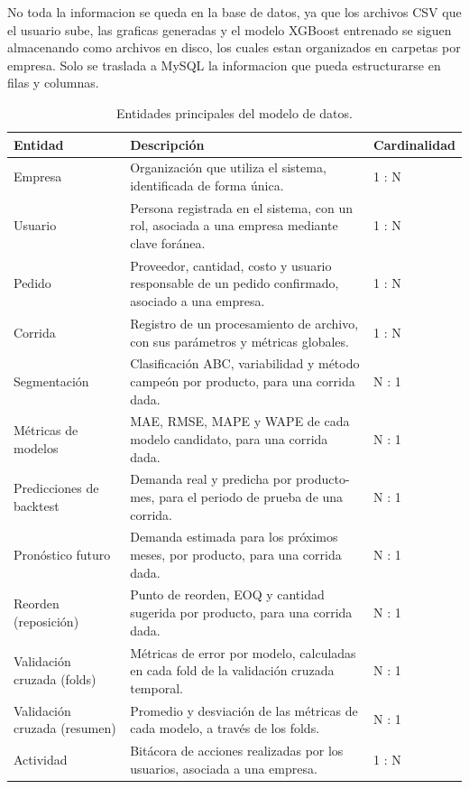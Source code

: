 No toda la informacion se queda en la base de datos, ya que los archivos CSV que el usuario sube, las graficas generadas y el modelo XGBoost entrenado se siguen almacenando como archivos en disco, los cuales estan organizados en carpetas por empresa. Solo se traslada a MySQL la informacion que pueda estructurarse en filas y columnas. 
%
\begin{table}[H]
    \centering
    \caption{Entidades principales del modelo de datos.}
    \label{tab:entidades}
    \begin{tabularx}{\textwidth}{lXl}
        \toprule
        \textbf{Entidad} & \textbf{Descripción} & \textbf{Cardinalidad} \\
        \midrule
        Empresa & Organización que utiliza el sistema, identificada de forma única. & 1 : N \\
        Usuario & Persona registrada en el sistema, con un rol, asociada a una empresa mediante clave foránea. & 1 : N \\
        Pedido & Proveedor, cantidad, costo y usuario responsable de un pedido confirmado, asociado a una empresa. & 1 : N \\
        Corrida & Registro de un procesamiento de archivo, con sus parámetros y métricas globales. & 1 : N \\
        Segmentación & Clasificación ABC, variabilidad y método campeón por producto, para una corrida dada. & N : 1 \\
        Métricas de modelos & MAE, RMSE, MAPE y WAPE de cada modelo candidato, para una corrida dada. & N : 1 \\
        Predicciones de backtest & Demanda real y predicha por producto-mes, para el periodo de prueba de una corrida. & N : 1 \\
        Pronóstico futuro & Demanda estimada para los próximos meses, por producto, para una corrida dada. & N : 1 \\
        Reorden (reposición) & Punto de reorden, EOQ y cantidad sugerida por producto, para una corrida dada. & N : 1 \\
        Validación cruzada (folds) & Métricas de error por modelo, calculadas en cada fold de la validación cruzada temporal. & N : 1 \\
        Validación cruzada (resumen) & Promedio y desviación de las métricas de cada modelo, a través de los folds. & N : 1 \\
        Actividad & Bitácora de acciones realizadas por los usuarios, asociada a una empresa. & 1 : N \\
        \bottomrule
    \end{tabularx}
\end{table}

